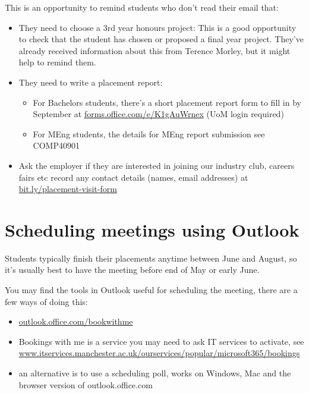 \documentclass[
]{book}
\providecommand{\tightlist}{%
  \setlength{\itemsep}{0pt}\setlength{\parskip}{0pt}}
\begin{document}
This is an opportunity to remind students who don't read their email that:

\begin{itemize}
\tightlist
\item
  They need to choose a 3rd year honours project: This is a good opportunity to check that the student has chosen or proposed a final year project. They've already received information about this from Terence Morley, but it might help to remind them.
\item
  They need to write a placement report:

  \begin{itemize}
  \tightlist
  \item
    For Bachelors students, there's a short placement report form to fill in by September at \href{https://forms.office.com/e/K1gAuWrnex}{forms.office.com/e/K1gAuWrnex} (UoM login required)
  \item
    For MEng students, the details for MEng report submission see COMP40901
  \end{itemize}
\item
  Ask the employer if they are interested in joining our industry club, careers fairs etc record any contact details (names, email addresses) at \url{bit.ly/placement-visit-form}
\end{itemize}

\section{Scheduling meetings using Outlook}\label{schedule}

Students typically finish their placements anytime between June and August, so it's usually best to have the meeting before end of May or early June.

You may find the tools in Outlook useful for scheduling the meeting, there are a few ways of doing this:

\begin{itemize}
\tightlist
\item
  \href{https://outlook.office.com/bookwithme}{outlook.office.com/bookwithme}
\item
  Bookings with me is a service you may need to ask IT services to activate, see \href{https://www.itservices.manchester.ac.uk/ourservices/popular/microsoft365/bookings/}{www.itservices.manchester.ac.uk/ourservices/popular/microsoft365/bookings}
\item
  an alternative is to use a scheduling poll, works on Windows, Mac and the browser version of outlook.office.com \citep{poll}
\end{itemize}
\end{document}
